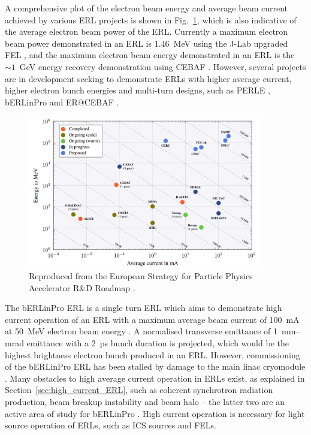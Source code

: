 \documentclass[../main.tex]{subfiles}
\begin{document}
A comprehensive plot of the electron beam energy and average beam current achieved by various ERL projects is shown in Fig.~\ref{fig:ERL_Landscape}, which is also indicative of the average electron beam power of the ERL. Currently a maximum electron beam power demonstrated in an ERL is 1.46~\si{\mega\electronvolt} using the J-Lab upgraded FEL \cite{neil2006jlab}, and the maximum electron beam energy demonstrated in an ERL is the $\sim1$~\si{\giga\electronvolt} energy recovery demonstration using CEBAF \cite{bogacz2003cebaf,tennant2003beam}. However, several projects are in development seeking to demonstrate ERLs with higher average current, higher electron bunch energies and multi-turn designs, such as PERLE \cite{angal2018perle}, bERLinPro \cite{kuske2012conceptual} and ER@CEBAF \cite{meot2016er}.

\begin{figure}[!h]
\centering
\includegraphics[width=0.9\textwidth]{Figures/CBETA_Multi-Pass_Commissioning/Tennant_ERL_Landscape.pdf}
\caption{Reproduced from the European Strategy for Particle Physics
Accelerator R&D Roadmap \cite{adolphsen2022european}.}
\label{fig:ERL_Landscape}
\end{figure}

The bERLinPro ERL is a single turn ERL which aims to demonstrate high current operation of an ERL with a maximum average beam current of 100~\si{\milli\ampere} at 50~\si{\mega\electronvolt} electron beam energy \cite{kuske2012conceptual,neumann2018berlinpro}. A normalised transverse emittance of 1~\si{\milli\meter}--\si{\milli\radian} emittance with a 2~\si{\pico\second} bunch duration is projected, which would be the highest brightness electron bunch produced in an ERL. However, commissioning of the bERLinPro ERL has been stalled by damage to the main linac cryomodule \cite{neumann2018berlinpro}. Many obstacles to high average current operation in ERLs exist, as explained in Section~\ref{sec:high_current_ERL}, such as coherent synchrotron radiation production, beam breakup instability and beam halo -- the latter two are an active area of study for bERLinPro \cite{neumann2012status,hwang2019first}. High current operation is necessary for light source operation of ERLs, such as ICS sources and FELs.  
\end{document}
